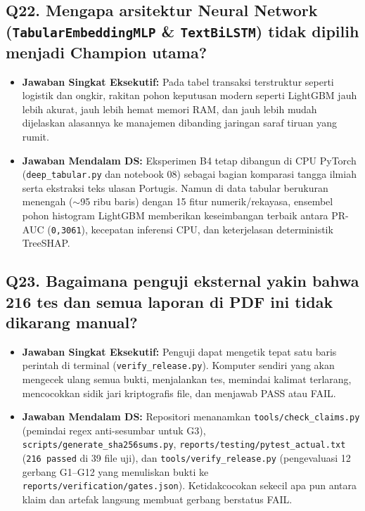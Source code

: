 \documentclass[11pt,a4paper,oneside]{book}
\newcommand{\code}[1]{{\small\nolinkurl{#1}}}
\begin{document}
\subsection*{Q22. Mengapa arsitektur Neural Network (\texttt{TabularEmbeddingMLP} \& \texttt{TextBiLSTM}) tidak dipilih menjadi Champion utama?}
\begin{itemize}
  \item \textbf{Jawaban Singkat Eksekutif:} Pada tabel transaksi terstruktur seperti logistik dan ongkir, rakitan pohon keputusan modern seperti LightGBM jauh lebih akurat, jauh lebih hemat memori RAM, dan jauh lebih mudah dijelaskan alasannya ke manajemen dibanding jaringan saraf tiruan yang rumit.
  \item \textbf{Jawaban Mendalam DS:} Eksperimen B4 tetap dibangun di CPU PyTorch (\code{deep_tabular.py} dan notebook 08) sebagai bagian komparasi tangga ilmiah serta ekstraksi teks ulasan Portugis. Namun di data tabular berukuran menengah ($\sim$95 ribu baris) dengan 15 fitur numerik/rekayasa, ensembel pohon histogram LightGBM memberikan keseimbangan terbaik antara PR-AUC (\code{0,3061}), kecepatan inferensi CPU, dan keterjelasan deterministik TreeSHAP.
\end{itemize}

\subsection*{Q23. Bagaimana penguji eksternal yakin bahwa 216 tes dan semua laporan di PDF ini tidak dikarang manual?}
\begin{itemize}
  \item \textbf{Jawaban Singkat Eksekutif:} Penguji dapat mengetik tepat satu baris perintah di terminal (\code{verify_release.py}). Komputer sendiri yang akan mengecek ulang semua bukti, menjalankan tes, memindai kalimat terlarang, mencocokkan sidik jari kriptografis file, dan menjawab PASS atau FAIL.
  \item \textbf{Jawaban Mendalam DS:} Repositori menanamkan \code{tools/check_claims.py} (pemindai regex anti-sesumbar untuk G3), \code{scripts/generate_sha256sums.py}, \code{reports/testing/pytest_actual.txt} (\code{216 passed} di 39 file uji), dan \code{tools/verify_release.py} (pengevaluasi 12 gerbang G1--G12 yang menuliskan bukti ke \code{reports/verification/gates.json}). Ketidakcocokan sekecil apa pun antara klaim dan artefak langsung membuat gerbang berstatus FAIL.
\end{itemize}
\end{document}
